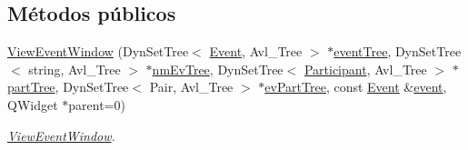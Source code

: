 \subsection*{Métodos públicos}
\begin{DoxyCompactItemize}
\item 
\hyperlink{class_view_event_window_a16d9b6e5f1f49d6f4c88d6fec5a18c97}{View\+Event\+Window} (Dyn\+Set\+Tree$<$ \hyperlink{class_event}{Event}, Avl\+\_\+\+Tree $>$ $\ast$\hyperlink{class_view_event_window_abd2eb5de94df8494ee40fe415345df82}{event\+Tree}, Dyn\+Set\+Tree$<$ string, Avl\+\_\+\+Tree $>$ $\ast$\hyperlink{class_view_event_window_adb04549d83a31b181e9e30b8eab928de}{nm\+Ev\+Tree}, Dyn\+Set\+Tree$<$ \hyperlink{class_participant}{Participant}, Avl\+\_\+\+Tree $>$ $\ast$\hyperlink{class_view_event_window_a7441ec3b0af9820d62c51a8d6da8c798}{part\+Tree}, Dyn\+Set\+Tree$<$ Pair, Avl\+\_\+\+Tree $>$ $\ast$\hyperlink{class_view_event_window_a97cd14a17389087aaf93daa48f283400}{ev\+Part\+Tree}, const \hyperlink{class_event}{Event} \&\hyperlink{class_view_event_window_a54296d443c15b3e7593e826bb9525b2e}{event}, Q\+Widget $\ast$parent=0)
\begin{DoxyCompactList}\small\item\em \hyperlink{class_view_event_window}{View\+Event\+Window}. \end{DoxyCompactList}\end{DoxyCompactItemize}
